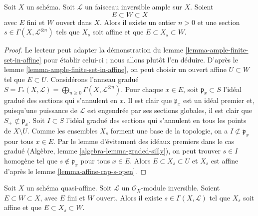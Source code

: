 \begin{lemma}
\label{lemma-ample-finite-set-in-principal-affine}
Soit $X$ un schéma. Soit $\mathcal{L}$ un faisceau inversible ample sur $X$.
Soient
$$
E \subset W \subset X
$$
avec $E$ fini et $W$ ouvert dans $X$. Alors il existe un entier $n > 0$
et une section $s \in \Gamma(X, \mathcal{L}^{\otimes n})$ tels que
$X_s$ soit affine et que $E \subset X_s \subset W$.
\end{lemma}

\begin{proof}
Le lecteur peut adapter la démonstration du lemme \ref{lemma-ample-finite-set-in-affine}
pour établir celui-ci ; nous allons plutôt l'en déduire. D'après
le lemme \ref{lemma-ample-finite-set-in-affine}, on peut choisir un ouvert
affine $U \subset W$ tel que $E \subset U$.
Considérons l'anneau gradué $S = \Gamma_*(X, \mathcal{L}) =
\bigoplus_{n \geq 0} \Gamma(X, \mathcal{L}^{\otimes n})$.
Pour chaque $x \in E$, soit $\mathfrak p_x \subset S$ l'idéal gradué des
sections qui s'annulent en $x$. Il est clair que $\mathfrak p_x$ est
un idéal premier et, puisqu'une puissance de $\mathcal{L}$ est engendrée
par ses sections globales, il est clair que $S_{+} \not \subset \mathfrak p_x$.
Soit $I \subset S$ l'idéal gradué des sections qui s'annulent en tous les
points de $X \setminus U$. Comme les ensembles $X_s$ forment une
base de la topologie, on a $I \not \subset \mathfrak p_x$ pour
tous $x \in E$.
Par le lemme d'évitement des idéaux premiers dans le cas gradué (Algèbre, lemme \ref{algebra-lemma-graded-silly}),
on peut trouver $s \in I$ homogène tel
que $s \not \in \mathfrak p_x$ pour tous $x \in E$.
Alors $E \subset X_s \subset U$ et $X_s$ est affine d'après
le lemme \ref{lemma-affine-cap-s-open}.
\end{proof}

\begin{lemma}
\label{lemma-quasi-affine-invertible-nonvanishing-section}
Soit $X$ un schéma quasi-affine. Soit $\mathcal{L}$ un
$\mathcal{O}_X$-module inversible. Soient $E \subset W \subset X$, avec $E$ fini
et $W$ ouvert. Alors il existe $s \in \Gamma(X, \mathcal{L})$
tel que $X_s$ soit affine et que $E \subset X_s \subset W$.
\end{lemma}

